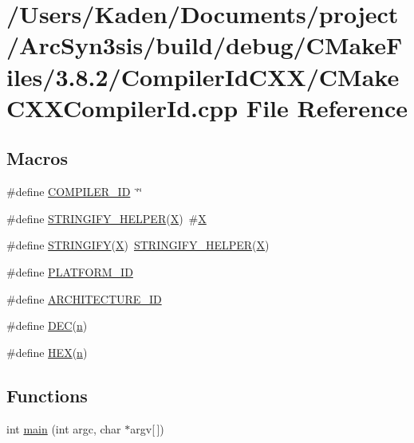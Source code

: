 \hypertarget{a00789}{}\section{/\+Users/\+Kaden/\+Documents/project/\+Arc\+Syn3sis/build/debug/\+C\+Make\+Files/3.8.2/\+Compiler\+Id\+C\+X\+X/\+C\+Make\+C\+X\+X\+Compiler\+Id.cpp File Reference}
\label{a00789}
\subsection*{Macros}
\begin{DoxyCompactItemize}
\item 
\#define \hyperlink{a00789_a81dee0709ded976b2e0319239f72d174}{C\+O\+M\+P\+I\+L\+E\+R\+\_\+\+ID}~\char`\"{}\char`\"{}
\item 
\#define \hyperlink{a00789_a2ae9b72bb13abaabfcf2ee0ba7d3fa1d}{S\+T\+R\+I\+N\+G\+I\+F\+Y\+\_\+\+H\+E\+L\+P\+ER}(\hyperlink{a00611_a708712aede48a739e9ae0c42413ef460}{X})~\#\hyperlink{a00611_a708712aede48a739e9ae0c42413ef460}{X}
\item 
\#define \hyperlink{a00789_a43e1cad902b6477bec893cb6430bd6c8}{S\+T\+R\+I\+N\+G\+I\+FY}(\hyperlink{a00611_a708712aede48a739e9ae0c42413ef460}{X})~\hyperlink{a00801_a2ae9b72bb13abaabfcf2ee0ba7d3fa1d}{S\+T\+R\+I\+N\+G\+I\+F\+Y\+\_\+\+H\+E\+L\+P\+ER}(\hyperlink{a00611_a708712aede48a739e9ae0c42413ef460}{X})
\item 
\#define \hyperlink{a00789_adbc5372f40838899018fadbc89bd588b}{P\+L\+A\+T\+F\+O\+R\+M\+\_\+\+ID}
\item 
\#define \hyperlink{a00789_aba35d0d200deaeb06aee95ca297acb28}{A\+R\+C\+H\+I\+T\+E\+C\+T\+U\+R\+E\+\_\+\+ID}
\item 
\#define \hyperlink{a00789_ad1280362da42492bbc11aa78cbf776ad}{D\+EC}(\hyperlink{a00623_a781a04ab095280f838ff3eb0e51312e0}{n})
\item 
\#define \hyperlink{a00789_a46d5d95daa1bef867bd0179594310ed5}{H\+EX}(\hyperlink{a00623_a781a04ab095280f838ff3eb0e51312e0}{n})
\end{DoxyCompactItemize}
\subsection*{Functions}
\begin{DoxyCompactItemize}
\item 
int \hyperlink{a00789_a0ddf1224851353fc92bfbff6f499fa97}{main} (int argc, char $\ast$argv\mbox{[}$\,$\mbox{]})
\end{DoxyCompactItemize}
